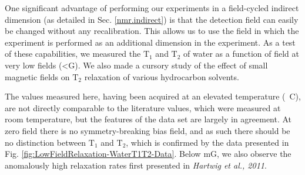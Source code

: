 \documentclass[PaulGanssle-Thesis.tex]{subfiles}
\begin{document}
One significant advantage of performing our experiments in a field-cycled indirect dimension (as detailed in Sec. \ref{nmr.indirect}) is that the detection field can easily be changed without any recalibration. This allows us to use the field in which the experiment is performed as an additional dimension in the experiment. As a test of these capabilities, we measured the $\mathrm{T}_{1}$ and $\mathrm{T}_{2}$ of water as a function of field at very low fields (<\unit[1]{G}). We also made a cursory study of the effect of small magnetic fields on $\mathrm{T}_{2}$ relaxation of various hydrocarbon solvents.

The values measured here, having been acquired at an elevated temperature (\unit[36]{\degsym C}), are not directly comparable to the literature values, which were measured at room temperature, but the features of the data set are largely in agreement. At zero field there is no symmetry-breaking bias field, and as such there should be no distinction between $\mathrm{T}_{1}$ and $\mathrm{T}_{2}$, which is confirmed by the data presented in Fig. \ref{fig:LowFieldRelaxation-WaterT1T2-Data}. Below \unit[100]{mG}, we also observe the anomalously high relaxation rates first presented in \emph{Hartwig et al., 2011}\cite{Hartwig2011}.
\end{document}
